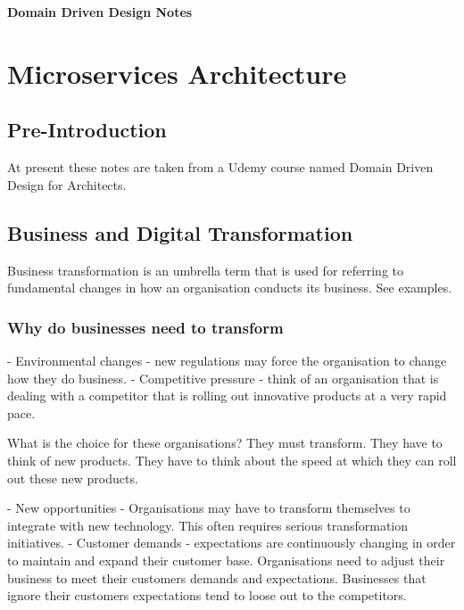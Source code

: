 \documentclass[a4paper, 11pt]{book}
\begin{document}
    \begin{titlepage}
        \centering
        \vspace*{2in}
        \Huge \textbf{Domain Driven Design Notes}
    \end{titlepage}

    \setcounter{section}{0}

    \newpage

    \tableofcontents
    \newpage

    \listoffigures
    \newpage


    \chapter{Microservices Architecture}


    \section{Pre-Introduction}
    At present these notes are taken from a Udemy course named Domain Driven Design for Architects.


    \section{Business and Digital Transformation}
    Business transformation is an umbrella term that is used for referring to fundamental changes in how an organisation conducts its business.
    See examples.

    \subsection{Why do businesses need to transform}
    - Environmental changes - new regulations may force the organisation to change how they do business.
    - Competitive pressure - think of an organisation that is dealing with a competitor that is rolling out innovative products at a very rapid pace.

    What is the choice for these organisations?
    They must transform.
    They have to think of new products.
    They have to think about the speed at which they can roll out these new products.

    - New opportunities - Organisations may have to transform themselves to integrate with new technology.
    This often requires serious transformation initiatives.
    - Customer demands - expectations are continuously changing in order to maintain and expand their customer base.
    Organisations need to adjust their business to meet their customers demands and expectations.
    Businesses that ignore their customers expectations tend to loose out to the competitors.
\end{document}
